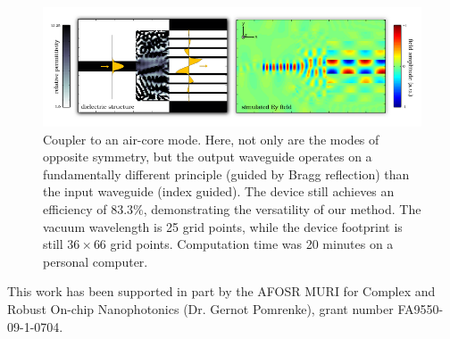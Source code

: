 \documentclass[letterpaper,10pt]{article}
\begin{document}
\begin{figure}[h]
    \centering
    \includegraphics[width=\textwidth]{quickfig/air-core}
    \caption{Coupler to an air-core mode.
        Here, not only are the modes of opposite symmetry,
        but the output waveguide operates on a fundamentally different
        principle (guided by Bragg reflection) than the input waveguide 
        (index guided).
        The device still achieves an efficiency of $83.3\%$, demonstrating the
        versatility of our method.
        The vacuum wavelength is 25 grid points, 
        while the device footprint is still $36 \times 66$ grid points.
        Computation time was 20 minutes on a personal computer.
        }
        \label{fig:aircore}
\end{figure}

% 
% 


This work has been supported in part by the 
    AFOSR MURI for Complex and Robust On-chip Nanophotonics 
    (Dr. Gernot Pomrenke), grant number FA9550-09-1-0704.
\end{document}

